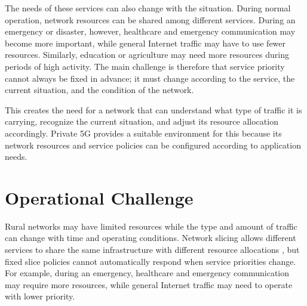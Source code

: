 \documentclass[12pt,a4paper]{report}
\begin{document}
The needs of these services can also change with the situation. During
normal operation, network resources can be shared among different
services. During an emergency or disaster, however, healthcare and
emergency communication may become more important, while general
Internet traffic may have to use fewer resources. Similarly, education
or agriculture may need more resources during periods of high activity.
The main challenge is therefore that service priority cannot always be
fixed in advance; it must change according to the service, the current
situation, and the condition of the network.


This creates the need for a network that can understand what type of
traffic it is carrying, recognize the current situation, and adjust its
resource allocation accordingly. Private 5G provides a suitable
environment for this because its network resources and service policies
can be configured according to application needs.
	

\section{Operational Challenge}
\label{sec:operational_challenge}

Rural networks may have limited resources while the type and amount of
traffic can change with time and operating conditions. Network slicing
allows different services to share the same infrastructure with
different resource allocations \cite{kazmi2019slicing},
but fixed slice policies cannot automatically respond when service
priorities change. For example, during an emergency, healthcare and
emergency communication may require more resources, while general
Internet traffic may need to operate with lower priority.
\end{document}
